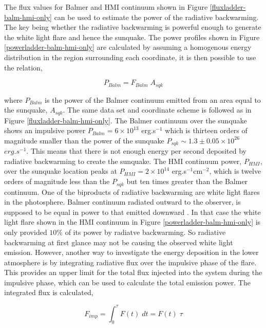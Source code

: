 The flux values for Balmer and HMI continuum shown in Figure \ref{fluxladder-balm-hmi-only} can be used to estimate the power of the radiative backwarming. The key being whether the radiative backwarming is powerful enough to generate the white light flare and hence the sunquake. The power profiles shown in Figure \ref{powerladder-balm-hmi-only} are calculated by assuming a homogenous energy distribution in the region surrounding each coordinate, it is then possible to use the relation,

\begin{equation}
P_{Balm} = F_{Balm} \; A_{sqk}  
\end{equation}\label{Pbalm}

where $P_{Balm}$ is the power of the Balmer continuum emitted from an area equal to the sunquake, $A_{sqk}$. The same data set and coordinate scheme is followed as in Figure \ref{fluxladder-balm-hmi-only}. The Balmer continuum over the sunquake shows an impulsive power $P_{Balm} = 6{\times}10^{13}$ erg.s$^{-1}$ which is thirteen orders of magnitude smaller than the power of the sunquake $P_{sqk} \sim 1.3\pm0.05{\times}10^{26}$ $erg.s^{-1}$. This means that there is not enough energy per second deposited by radiative backwarming to create the sunquake. The HMI continuum power, $P_{HMI}$, over the sunquake location peaks at $P_{HMI} = 2{\times}10^{14}$ erg.s$^{-1}$cm$^{-2}$, which is twelve orders of magnitude less than the $P_{sqk}$ but ten times greater than the Balmer continuum. One of the biproducts of radiative backwarming are white light flares in the photosphere. Balmer continuum radiated outward to the observer, is supposed to be equal in power to that emitted downward \citep{1989SoPh..124..303M}. In that case the white light flare shown in the HMI continuum in Figure \ref{powerladder-balm-hmi-only} is only provided $10\%$ of its power by radiatve backwarming. So radiative backwarming at first glance may not be causing the observed white light emission. However, another way to investigate the energy deposition in the lower atmosphere is by integrating radiative flux over the impulsive phase of the flare. This provides an upper limit for the total flux injected into the system during the impulsive phase, which can be used to calculate the total emission power. The integrated flux is calculated,

\begin{equation}
F_{imp} = \int_{0}^{\tau} F(t) \; dt = F(t) \; \tau
\end{equation}\label{f-imp}
 
